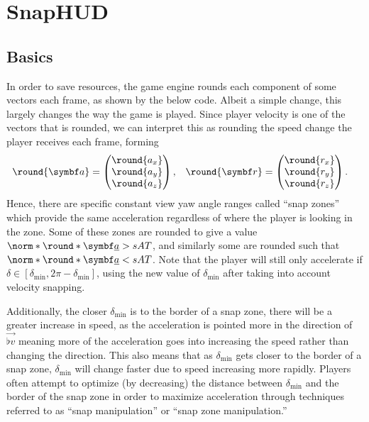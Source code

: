 \section{SnapHUD}
\label{sec:snaphud}

\subsection{Basics}
\label{sec:snap_basics}
In order to save resources, the game engine rounds each component of some vectors each frame, as shown by the below code. Albeit a simple change, this largely changes the way the game is played.
Since player velocity is one of the vectors that is rounded, we can interpret this as rounding the speed change the player receives each frame, forming
\begin{align*}
\round{\vec{a}} &=
\begin{pmatrix}
\round{a_x} \\ \round{a_y} \\ \round{a_z}
\end{pmatrix}, & \round{\vec{r}} &=
\begin{pmatrix}
\round{r_x} \\ \round{r_y} \\ \round{r_z}
\end{pmatrix}.
\end{align*}
Hence, there are specific constant view yaw angle ranges called ``snap zones'' which provide the same acceleration regardless of where the player is looking in the zone.
Some of these zones are rounded to give a value $\norm*{\round*{\vec{\flat{a}}}} > sAT$, and similarly some are rounded such that $\norm*{\round*{\vec{\flat{a}}}} < sAT$.
Note that the player will still only accelerate if $\delta \in [\delta_{\min}, 2\pi - \delta_{\min}]$, using the new value of $\delta_{\min}$ after taking into account velocity snapping.

Additionally, the closer $\delta_{\min}$ is to the border of a snap zone, there will be a greater increase in speed, as the acceleration is pointed more in the direction of $\vec{\flat{v}}$ meaning more of the acceleration goes into increasing the speed rather than changing the direction.
This also means that as $\delta_{\min}$ gets closer to the border of a snap zone, $\delta_{\min}$ will change faster due to speed increasing more rapidly.
Players often attempt to optimize (by decreasing) the distance between $\delta_{\min}$ and the border of the snap zone in order to maximize acceleration through techniques referred to as ``snap manipulation'' or ``snap zone manipulation.''\\

